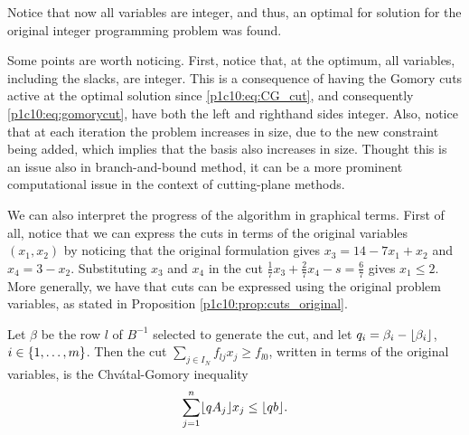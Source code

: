Notice that now all variables are integer, and thus, an optimal for solution for the original integer programming problem was found. 

Some points are worth noticing. First, notice that, at the optimum, all variables, including the slacks, are integer. This is a consequence of having the Gomory cuts active at the optimal solution since \eqref{p1c10:eq:CG_cut}, and consequently \eqref{p1c10:eq:gomorycut}, have both the left and righthand sides integer. Also, notice that at each iteration the problem increases in size, due to the new constraint being added, which implies that the basis also increases in size. Thought this is an issue also in branch-and-bound method, it can be a more prominent computational issue in the context of cutting-plane methods. 

We can also interpret the progress of the algorithm in graphical terms. First of all, notice that we can express the cuts in terms of the original variables $(x_1,x_2)$ by noticing that the original formulation gives $x_3 = 14 - 7x_1 + x_2$ and $x_4 = 3-x_2$. Substituting $x_3$ and $x_4$ in the cut $\frac{1}{7}x_3 + \frac{2}{7}x_4 - s = \frac{6}{7}$ gives $x_1 \leq 2$. More generally, we have that cuts can be expressed using the original problem variables, as stated in Proposition \ref{p1c10:prop:cuts_original}.

\begin{proposition} \label{p1c10:prop:cuts_original}
     Let $\beta$ be the row $l$ of $B^{-1}$ selected to generate the cut, and let $q_i = \beta_i - \lfloor \beta_i \rfloor$, $i \in \left\{ 1,\dots, m \right \}$. Then the cut $\sum_{j \in I_N}f_{lj}x_j \geq f_{l0}$, written in terms of the original variables, is the Chv\'atal-Gomory inequality 
 $$ \sum_{j=1}^n \lfloor qA_j \rfloor x_j \leq \lfloor qb \rfloor. $$
 \end{proposition}

